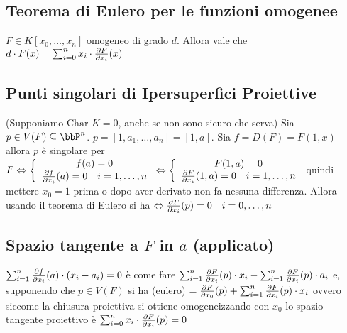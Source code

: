 \documentclass[a4paper,NoNotes,GeneralMath]{stdmdoc}
\newcommand{\Char}{\text{Char }}
\begin{document}
	\subsection*{Teorema di Eulero per le funzioni omogenee}
	$F \in K[x_0, \ldots, x_n]$ omogeneo di grado $d$. Allora vale che $d \cdot F (x) = \sum_{i=0}^{n} x_i \cdot \dpar{F}{x_i} (x)$
	
	\subsection*{Punti singolari di Ipersuperfici Proiettive}
	(Supponiamo $\Char K = 0$, anche se non sono sicuro che serva) Sia $p \in V(F) \subseteq \bbP^n$. $p = [1, a_1, \ldots, a_n] = [1, a]$. Sia $f = D(F) = F(1,x)$ allora $p$ è singolare per $F \sse \left\{ \begin{array}{c} f(a) = 0 \\ \dpar{f}{x_i}(a) = 0 \quad i = 1, \ldots, n \end{array} \right. \sse \left\{ \begin{array}{c} F(1,a) = 0 \\ \dpar{F}{x_i} (1,a) = 0 \quad i = 1, \ldots, n \end{array} \right.$ quindi mettere $x_0 = 1 $ prima o dopo aver derivato non fa nessuna differenza. Allora usando il teorema di Eulero si ha $\sse \dpar{F}{x_i}(p) = 0 \quad i=0,\ldots, n$
	
	\subsection*{Spazio tangente a $F$ in $a$ (applicato)}
	$\sum_{i=1}^{n} \dpar{f}{x_i} (a) \cdot (x_i - a_i) = 0$ è come fare $\sum_{i=1}^{n} \dpar{F}{x_i} (p) \cdot x_i - \sum_{i=1}^{n} \dpar{F}{x_i} (p) \cdot a_i$ e, supponendo che $p \in V(F)$ si ha (eulero) $ = \dpar{F}{x_0} (p) + \sum_{i=1}^n \dpar{F}{x_i}(p) \cdot x_i$ ovvero siccome la chiusura proiettiva si ottiene omogeneizzando con $x_0$ lo spazio tangente proiettivo è $\sum_{i=0}^n x_i \cdot \dpar{F}{x_i}(p) = 0$
	
\end{document}
